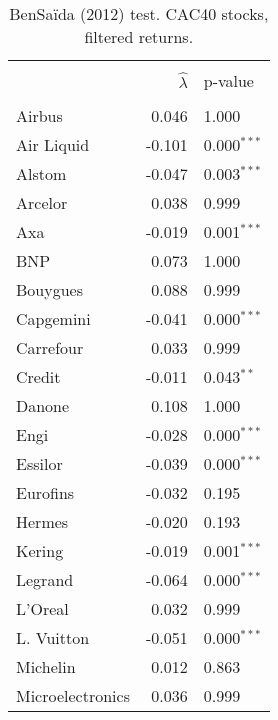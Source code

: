 \documentclass[12pt]{article}
\begin{document}
\begin{table} [H]\scriptsize
    \caption{ BenSa\"{i}da (2012) test. CAC40 stocks, filtered returns.}
        \footnotesize
    \begin{tabular*}{\textwidth}{@{\extracolsep{\fill}}lrl}
        \hline &  &  \\ 
        
                  & $\hat{\lambda}$ &  p-value \\
        \hline &  &  \\ 
        Airbus                     & 0.046  & 1.000\\ 
        Air Liquid                 & -0.101 & 0.000$^{***}$  \\ 
        Alstom                     & -0.047 &  0.003$^{***}$ \\ 
        Arcelor                    & 0.038   & 0.999  \\ 
        Axa                        & -0.019 & 0.001$^{***}$  \\ 
        BNP                        &  0.073 & 1.000  \\ 
        Bouygues                   & 0.088  &  0.999  \\ 
        Capgemini                  & -0.041 & 0.000$^{***}$  \\ 
        Carrefour                  & 0.033  &  0.999 \\ 
        Credit                     & -0.011 &  0.043$^{**}$ \\ 
        Danone                     &  0.108 &  1.000 \\ 
        Engi                       & -0.028 &  0.000$^{***}$ \\ 
        Essilor                    & -0.039 &  0.000$^{***}$ \\ 
        Eurofins                   & -0.032 &  0.195 \\ 
        Hermes                     & -0.020 &  0.193 \\ 
        Kering                     & -0.019 & 0.001$^{***}$  \\ 
        Legrand                    & -0.064 & 0.000$^{***}$  \\ 
        L'Oreal                    &  0.032  & 0.999  \\ 
				L. Vuitton                 & -0.051 & 0.000$^{***}$  \\ 
        Michelin                   & 0.012   &  0.863 \\ 
        Microelectronics           & 0.036   &  0.999 \\ 

\end{tabular*}
\end{table}
\end{document}
